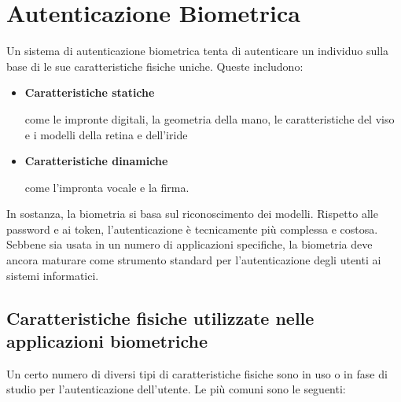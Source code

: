 \section{Autenticazione Biometrica}
Un sistema di autenticazione biometrica tenta di autenticare un individuo sulla base di le sue caratteristiche fisiche uniche. Queste includono:
\begin{itemize}
    \item \textbf{Caratteristiche statiche}
    
    come le impronte digitali, la geometria della mano, le caratteristiche del viso e i modelli della retina e dell'iride
    
    \item \textbf{Caratteristiche dinamiche}
    
    come l'impronta vocale e la firma.
\end{itemize}
In sostanza, la biometria si basa sul riconoscimento dei modelli. Rispetto alle password e ai token, l'autenticazione è tecnicamente più complessa e costosa. Sebbene sia usata in un numero di applicazioni specifiche, la biometria deve ancora maturare come strumento standard per l'autenticazione degli utenti ai sistemi informatici.
\subsection{Caratteristiche fisiche utilizzate nelle applicazioni biometriche}
Un certo numero di diversi tipi di caratteristiche fisiche sono in uso o in fase di studio per l'autenticazione dell'utente. Le più comuni sono le seguenti:


